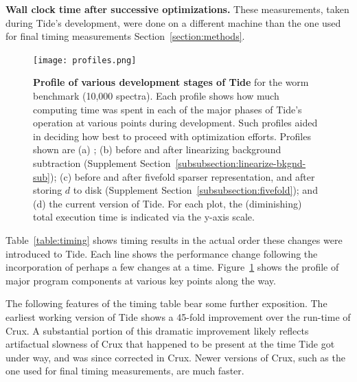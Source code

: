 \begin{table}
\centering

\caption{{\bf Wall clock time after successive optimizations.}
  \DIFaddbeginFL {}\DIFaddendFL These
  measurements, taken during Tide's development, were done on a
  different machine than the one used for final timing measurements
  \DIFdelbeginFL {}\DIFdelendFL \DIFaddbeginFL {}\DIFaddendFL Section~\ref{section:methods}\DIFaddbeginFL \DIFaddFL{)}\DIFaddendFL .
  \label{table:timing}}
\end{table}

\begin{figure}
\centering
\texttt{[image: profiles.png]}
\caption{{\bf Profile of various development stages of Tide} for the worm
  benchmark (10,000 spectra).  Each profile shows how much computing
  time was spent in each of the major phases of Tide's operation at
  various points during development.  Such profiles aided in deciding
  how best to proceed with optimization efforts. Profiles shown are
  (a) \tidezero; (b) before and after linearizing background
  subtraction (Supplement
  Section~\ref{subsubsection:linearize-bkgnd-sub}); (c) before and
  after fivefold sparser representation, and after storing $d$ to disk
  (Supplement Section~\ref{subsubsection:fivefold}); and (d) the
  current version of Tide. For each plot, the (diminishing) total
  execution time is indicated via the y-axis scale.
  \label{figure:profiles}}
\end{figure}

Table~\ref{table:timing} shows timing results in the actual order
these changes were introduced to Tide\DIFaddbegin {}\DIFaddend . Each line shows the performance change
following the incorporation of perhaps a few changes at a
time. Figure~\ref{figure:profiles} shows the profile of major program
components at various key points along the way.

The following features of the timing table bear some further
exposition. The earliest working version of Tide shows a 45-fold
improvement over the run-time of Crux. A substantial portion of this
dramatic improvement likely reflects artifactual slowness of Crux that
happened to be present at the time Tide got under way, and was since
corrected in Crux. Newer versions of Crux, such as the one used for final
timing measurements, are much faster.

